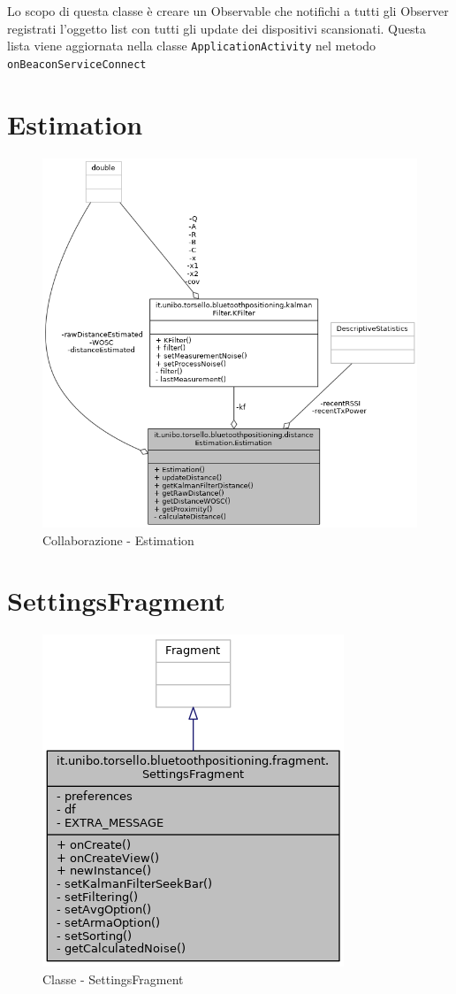 Lo scopo di questa classe è creare un Observable che notifichi a tutti gli Observer registrati l'oggetto list con tutti gli update dei dispositivi scansionati. Questa lista viene aggiornata nella classe \texttt{ApplicationActivity} nel metodo \texttt{onBeaconServiceConnect}

\newpage
\section{Estimation}
\begin{figure}[ph]
	\centering
	\includegraphics[width=1.2\linewidth]{img/uml/class/classit_1_1unibo_1_1torsello_1_1bluetoothpositioning_1_1distanceEstimation_1_1Estimation__coll__graph.png}
	\caption{Collaborazione - Estimation}
\end{figure}

\newpage
\section{SettingsFragment}
\begin{figure}[ph]
	\centering
	\includegraphics[width=0.5\linewidth]{img/uml/class/classit_1_1unibo_1_1torsello_1_1bluetoothpositioning_1_1fragment_1_1SettingsFragment__inherit__graph.png}
	\caption{Classe - SettingsFragment}
\end{figure}

